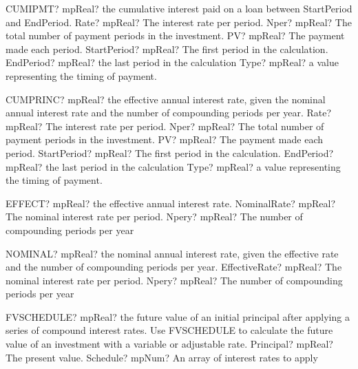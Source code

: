 \documentclass[12pt,a4paper,openany]{book}
\begin{document}
\begin{mpFunctionsExtract}
\mpWorksheetFunctionSixNotImplemented
{CUMIPMT? mpReal? the cumulative interest paid on a loan between StartPeriod and EndPeriod.}
{Rate? mpReal? The interest rate per period.}
{Nper? mpReal? The total number of payment periods in the investment.}
{PV? mpReal? The payment made each period.}
{StartPeriod? mpReal? The first period in the calculation.}
{EndPeriod? mpReal? the last period in the calculation}
{Type? mpReal? a value representing the timing of payment.}
\end{mpFunctionsExtract}

\begin{mpFunctionsExtract}
\mpWorksheetFunctionSixNotImplemented
{CUMPRINC? mpReal? the effective annual interest rate, given the nominal annual interest rate and the number of compounding periods per year.}
{Rate? mpReal? The interest rate per period.}
{Nper? mpReal? The total number of payment periods in the investment.}
{PV? mpReal? The payment made each period.}
{StartPeriod? mpReal? The first period in the calculation.}
{EndPeriod? mpReal? the last period in the calculation}
{Type? mpReal? a value representing the timing of payment.}
\end{mpFunctionsExtract}

\begin{mpFunctionsExtract}
\mpWorksheetFunctionTwoNotImplemented
{EFFECT? mpReal? the effective annual interest rate.}
{NominalRate? mpReal? The nominal interest rate per period.}
{Npery? mpReal? The number of compounding periods per year}
\end{mpFunctionsExtract}

\begin{mpFunctionsExtract}
\mpWorksheetFunctionTwoNotImplemented
{NOMINAL? mpReal? the nominal annual interest rate, given the effective rate and the number of compounding periods per year.}
{EffectiveRate? mpReal? The nominal interest rate per period.}
{Npery? mpReal? The number of compounding periods per year}
\end{mpFunctionsExtract}

\begin{mpFunctionsExtract}
\mpWorksheetFunctionTwoNotImplemented
{FVSCHEDULE? mpReal? the future value of an initial principal after applying a series of compound interest rates. Use FVSCHEDULE to calculate the future value of an investment with a variable or adjustable rate.}
{Principal? mpReal? The present value.}
{Schedule? mpNum? An array of interest rates to apply}
\end{mpFunctionsExtract}
\end{document}
